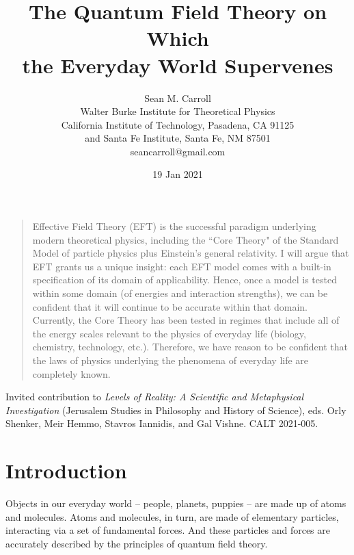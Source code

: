 \documentclass[12pt,letterpaper]{article}
\begin{document}
 
\date{19 Jan 2021}
\title{The Quantum Field Theory on Which \\ the Everyday World Supervenes}

 \author{Sean M. Carroll\\
 Walter Burke Institute for Theoretical Physics\\
 California Institute of Technology, Pasadena, CA 91125\\
 and Santa Fe Institute, Santa Fe, NM 87501\\
 seancarroll@gmail.com}
\maketitle

\begin{quotation} \noindent
Effective Field Theory (EFT) is the successful paradigm underlying modern theoretical physics, including the ``Core Theory" of the Standard Model of particle physics plus Einstein's general relativity. I will argue that EFT grants us a unique insight: each EFT model comes with a built-in specification of its domain of applicability. Hence, once a model is tested within some domain (of energies and interaction strengths), we can be confident that it will continue to be accurate within that domain. Currently, the Core Theory has been tested in regimes that include all of the energy scales relevant to the physics of everyday life (biology, chemistry, technology, etc.). Therefore, we have reason to be confident that the laws of physics underlying the phenomena of everyday life are completely known.
\end{quotation}


\vfill
\noindent
Invited contribution to \textit{Levels of Reality: A Scientific and Metaphysical Investigation} (Jerusalem Studies in Philosophy and History of Science), eds. Orly Shenker, Meir Hemmo, Stavros Iannidis, and Gal Vishne. CALT 2021-005.

\newpage

\section{Introduction}

Objects in our everyday world -- people, planets, puppies -- are made up of atoms and molecules. 
Atoms and molecules, in turn, are made of elementary particles, interacting via a set of fundamental forces.
And these particles and forces are accurately described by the principles of quantum field theory.
\end{document}
